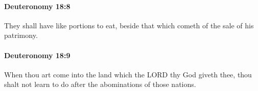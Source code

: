 		\paragraph{Deuteronomy 18:8} %
			\label{DEUTERONOMY-18-8}

			They shall have like portions to eat, beside that which cometh of the sale of his patrimony.


		\paragraph{Deuteronomy 18:9} %
			\label{DEUTERONOMY-18-9}

			When thou art come into the land which the LORD thy God giveth thee, thou shalt not learn to do after the abominations of those nations.


